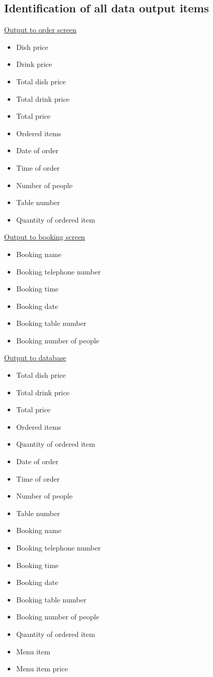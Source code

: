 \subsection{Identification of all data output items}

\underline{Output to order screen} \\

\begin{itemize}
	\item Dish price
	\item Drink price
	\item Total dish price
	\item Total drink price
	\item Total price
	\item Ordered items
	\item Date of order
	\item Time of order
	\item Number of people
	\item Table number
	\item Quantity of ordered item
\end {itemize}

\underline{Output to booking screen} \\

\begin{itemize}
	\item Booking name
	\item Booking telephone number
	\item Booking time
	\item Booking date
	\item Booking table number
	\item Booking number of people
\end{itemize}

\underline{Output to database} \\

\begin{itemize}
	\item Total dish price
	\item Total drink price
	\item Total price
	\item Ordered items
	\item Quantity of ordered item
	\item Date of order
	\item Time of order
	\item Number of people
	\item Table number
	\item Booking name
	\item Booking telephone number
	\item Booking time
	\item Booking date
	\item Booking table number
	\item Booking number of people
	\item Quantity of ordered item
	\item Menu item
	\item Menu item price
\end {itemize}


